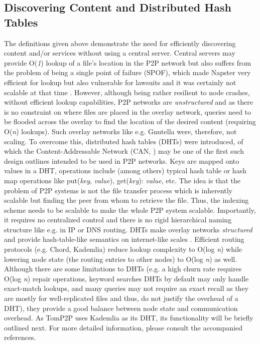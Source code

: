 \subsection{Discovering Content and Distributed Hash Tables}
The definitions given above demonstrate the need for efficiently discovering content and/or services without using a central server. Central servers may provide O(\textit{1}) lookup of a file's location in the P2P network but also suffers from the problem of being a single point of failure (SPOF), which made Napster very efficient for lookup but also vulnerable for lawsuits \cite{Chawathe2003} and it was certainly not scalable at that time \cite{Ratnasamy:2001:SCN:964723.383072}. However, although being rather resilient to node crashes, without efficient lookup capabilities, P2P networks are \textit{unstructured} and as there is no constraint on where files are placed in the overlay network, queries need to be flooded across the overlay to find the location of the desired content (requiring O(\textit{n}) lookups). Such overlay networks like e.g. Gnutella were, therefore, not scaling. To overcome this, distributed hash tables (DHTs) were introduced, of which the Content-Addressable Network (CAN, \cite{Ratnasamy:2001:SCN:964723.383072}) may be one of the first such design outlines intended to be used in P2P networks. Keys are mapped onto values in a DHT, operations include (among others) typical hash table or hash map operations like put(\textit{key}, \textit{value}), get(\textit{key}): \textit{value}, etc. The idea is that the problem of P2P systems is not the file transfer process which is inherently scalable but finding the peer from whom to retrieve the file\cite{Ratnasamy:2001:SCN:964723.383072}. Thus, the indexing scheme needs to be scalable to make the whole P2P system scalable. Importantly, it requires no centralized control and there is no rigid hierarchical naming structure like e.g. in IP or DNS routing. DHTs make overlay networks \textit{structured} and provide hash-table-like semantics on internet-like scales \cite{Ratnasamy:2001:SCN:964723.383072}. Efficient routing protocols (e.g. Chord\cite{Stoica2001}, Kademlia\cite{Maymounkov:2002:KPI:646334.687801}) reduce lookup complexity to O(log \textit{n}) while lowering node state (the routing entries to other nodes) to O(log \textit{n}) as well. Although there are some limitations to DHTs (e.g. a high churn rate requires O(log \textit{n}) repair operations, keyword searches DHTs by default may only handle exact-match lookups, and many queries may not require an exact recall as they are mostly for well-replicated files and thus, do not justify the overhead of a DHT\cite{Chawathe2003}), they provide a good balance between node state and communication overhead. As TomP2P uses Kademlia as its DHT, its functionality will be briefly outlined next. For more detailed information, please consult the accompanied references.

